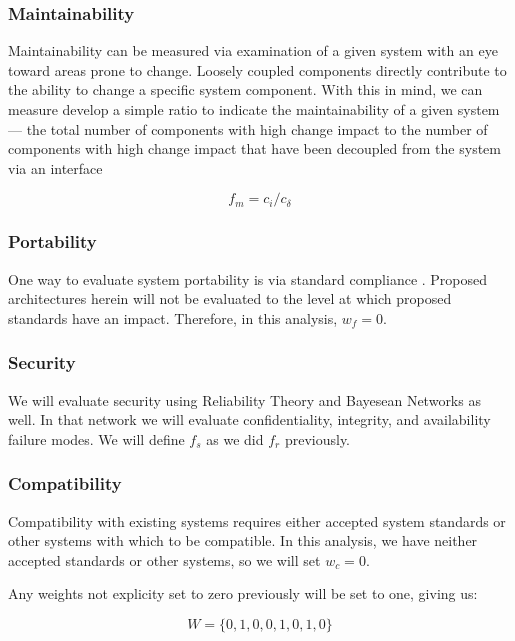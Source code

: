 \subsubsection*{Maintainability}
Maintainability can be measured via examination of a given system with an eye toward areas prone to change.  Loosely coupled components directly contribute to the ability to change a specific system component.  With this in mind, we can measure develop a simple ratio to indicate the maintainability of a given system --- the total number of components with high change impact to the number of components with high change impact that have been decoupled from the system via an interface 

\begin{equation}
f_{m} = c_{i} / c_{\delta}
\end{equation}

\subsubsection*{Portability}
One way to evaluate system portability is via standard compliance \cite{IT QUALITY PAPER}.  Proposed architectures herein will not be evaluated to the level at which proposed standards have an impact.  Therefore, in this analysis, $ w_{f} =0 $.

\subsubsection*{Security}
We will evaluate security using Reliability Theory and Bayesean Networks as well.  In that network we will evaluate confidentiality, integrity, and availability failure modes.  We will define $ f_{s} $ as we did $ f_{r} $ previously.

\subsubsection*{Compatibility}
Compatibility with existing systems requires either accepted system standards or other systems with which to be compatible.  In this analysis, we have neither accepted standards or other systems, so we will set $ w_{c} = 0 $.

Any weights not explicity set to zero previously will be set to one, giving us:

\begin{equation}
W = \lbrace 0, 1, 0, 0, 1, 0, 1, 0 \rbrace
\end{equation}

